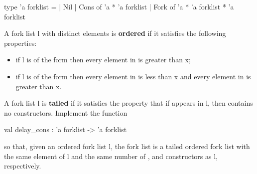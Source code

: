 \begin{enumerate}
  \begin{ocaml}
    type 'a forklist =
      | Nil
      | Cons of 'a * 'a forklist
      | Fork of 'a * 'a forklist * 'a forklist
  \end{ocaml}
  A fork list \codel l with distinct elements is \textbf{ordered} if it satisfies the following properties:
  \begin{itemize}
  \item
    if \codel l is of the form  then every element in  is
    greater than \codel x;
  \item
    if \codel l is of the form  then every element in
     is less than \codel x and every element in  is greater than
    \codel x.
  \end{itemize}
  A fork list \codel l is \textbf{tailed} if it satisfies the property that if  appears in \codel l, then  contains no  constructors.
  Implement the function
  \begin{ocaml}
    val delay_cons : 'a forklist -> 'a forklist
  \end{ocaml}
  so that, given an ordered fork list \codel l, the fork list  is a tailed ordered fork list with the same element of \codel l and the same number of ,  and  constructors as \codel l, respectively.
\end{enumerate}
